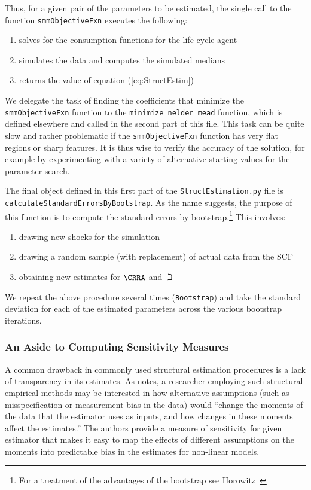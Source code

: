 \documentclass[SolvingMicroDSOPs]{subfiles}
\begin{document}
Thus, for a given pair of the parameters to be estimated, the single
call to the function \texttt{smmObjectiveFxn} executes the following:
\begin{enumerate}
\item solves for the consumption functions for the life-cycle agent
\item simulates the data and computes the simulated medians
\item returns the value of equation (\ref{eq:StructEstim})
\end{enumerate}

We delegate the task of finding the coefficients that minimize the \texttt{smmObjectiveFxn} function to the \texttt{minimize\_nelder\_mead} function, which is defined elsewhere and called in the second part of this file.  This task can be quite slow and rather problematic if the \texttt{smmObjectiveFxn} function has very flat regions or sharp features. It is thus wise to verify the accuracy of the solution, for example by experimenting with a variety of alternative starting values for the parameter search.

The final object defined in this first part of the \texttt{StructEstimation.py}
file is \texttt{calculateStandardErrorsByBootstrap}. As the name suggests, the
purpose of this function is to compute the standard errors by bootstrap.\footnote{For a
  treatment of the advantages of the bootstrap see
  Horowitz~\citeyearpar{horowitzBootstrap}} This involves:
\begin{enumerate}
\item drawing new shocks for the simulation
\item drawing a random sample (with replacement) of actual data from the SCF
\item obtaining new estimates for $\CRRA$ and $\beth$
\end{enumerate}
We repeat the above procedure several times (\texttt{Bootstrap}) and
take the standard deviation for each of the estimated parameters across the various bootstrap iterations.

\hypertarget{sensitivity-measures}{}
\subsubsection{An Aside to Computing Sensitivity Measures}\label{subsubsec:sensmeas}


A common drawback in commonly used structural estimation procedures is a lack of transparency in its estimates.  As \cite{andrews2017measuring} notes, a researcher employing such structural empirical methods may be interested in how alternative assumptions (such as misspecification or measurement bias in the data) would ``change the moments of the data that the estimator uses as inputs, and how changes in these moments affect the estimates.'' The authors provide a measure of sensitivity for given estimator that makes it easy to map the effects of different assumptions on the moments into predictable bias in the estimates for non-linear models.
\end{document}
